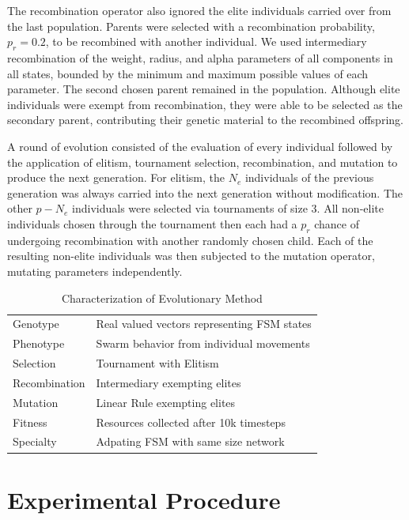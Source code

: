 \documentclass[12pt,journal,compsoc]{IEEEtran}
\begin{document}
The recombination operator also ignored the elite individuals carried over from the last population. Parents were selected with a recombination probability, $p_r=0.2$, to be recombined with another individual. We used intermediary recombination of the weight, radius, and alpha parameters of all components in all states, bounded by the minimum and maximum possible values of each parameter. The second chosen parent remained in the population. Although elite individuals were exempt from recombination, they were able to be selected as the secondary parent, contributing their genetic material to the recombined offspring.

A round of evolution consisted of the evaluation of every individual followed by the application of elitism, tournament selection, recombination, and mutation to produce the next generation. For elitism, the $N_e$ individuals of the previous generation was always carried into the next generation without modification. The other $p-N_e$ individuals were selected via tournaments of size 3. All non-elite individuals chosen through the tournament then each had a $p_r$ chance of undergoing recombination with another randomly chosen child. Each of the resulting non-elite individuals was then subjected to the mutation operator, mutating parameters independently.

\begin{table}
    \renewcommand{\arraystretch}{1.5}
    \centering
    \begin{tabular}{|l|l|}
        \hline
        Genotype & Real valued vectors representing FSM states \\
        Phenotype & Swarm behavior from individual movements \\
        Selection & Tournament with Elitism \\
        Recombination & Intermediary exempting elites \\
        Mutation & Linear Rule exempting elites \\
        Fitness & Resources collected after 10k timesteps \\
        Specialty & Adpating FSM with same size network \\
        \hline
    \end{tabular}
    \caption{Characterization of Evolutionary Method}
    \label{table:evolvemethod}
\end{table}

\section{Experimental Procedure}
\end{document}

